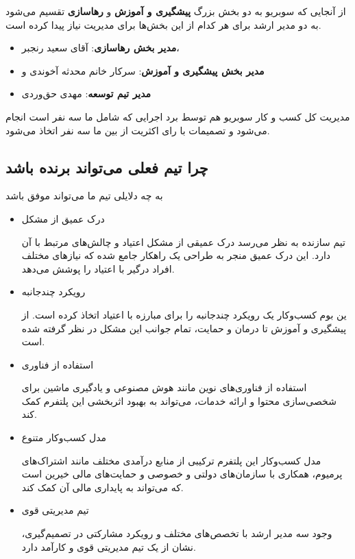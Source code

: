 \documentclass[dvipsnames, svgnames, x11names, 11pt]{article}
\begin{document}
از آنجایی که سوبریو به دو بخش بزرگ \textbf{پیشگیری و آموزش} و \textbf{رهاسازی} تقسیم می‌شود به دو مدیر ارشد برای هر کدام از این بخش‌ها برای مدیریت نیاز پیدا کرده است.

\begin{itemize}
\item \textbf{مدیر بخش رهاسازی}: آقای سعید رنجبر،
\item \textbf{مدیر بخش پیشگیری و آموزش}: سرکار خانم محدثه آخوندی و
\item \textbf{مدیر تیم توسعه}: مهدی حق‌وردی
\end{itemize}

مدیریت کل کسب و کار سوبریو هم توسط برد اجرایی که شامل ما سه نفر است انجام می‌شود و تصمیمات با رای اکثریت از بین ما سه نفر اتخاذ می‌شود.

\subsection{چرا تیم فعلی می‌تواند برنده باشد}
به چه دلایلی تیم ما می‌تواند موفق باشد
\begin{itemize}
\item 
درک عمیق از مشکل

تیم سازنده به نظر می‌رسد درک عمیقی از مشکل اعتیاد و چالش‌های مرتبط با آن دارد. این درک عمیق منجر به طراحی یک راهکار جامع شده که نیازهای مختلف افراد درگیر با اعتیاد را پوشش می‌دهد.

\item 
رویکرد چندجانبه

ین بوم کسب‌وکار یک رویکرد چندجانبه را برای مبارزه با اعتیاد اتخاذ کرده است. از پیشگیری و آموزش تا درمان و حمایت، تمام جوانب این مشکل در نظر گرفته شده است.


\item 
استفاده از فناوری

استفاده از فناوری‌های نوین مانند هوش مصنوعی و یادگیری ماشین برای شخصی‌سازی محتوا و ارائه خدمات، می‌تواند به بهبود اثربخشی این پلتفرم کمک کند.

\item 
مدل کسب‌وکار متنوع

مدل کسب‌وکار این پلتفرم ترکیبی از منابع درآمدی مختلف مانند اشتراک‌های پرمیوم، همکاری با سازمان‌های دولتی و خصوصی و حمایت‌های مالی خیرین است که می‌تواند به پایداری مالی آن کمک کند.

\item
تیم مدیریتی قوی

وجود سه مدیر ارشد با تخصص‌های مختلف و رویکرد مشارکتی در تصمیم‌گیری، نشان از یک تیم مدیریتی قوی و کارآمد دارد.
\end{itemize}
\end{document}
